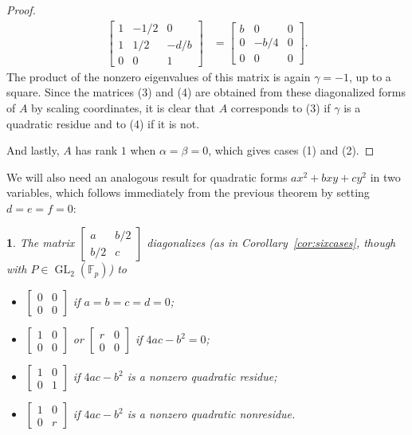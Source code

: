 \documentclass[10pt,a4paper]{amsart}
\numberwithin{equation}{section}
\numberwithin{figure}{section}
\theoremstyle{definition}
\theoremstyle{remark}
\theoremstyle{plain}
\theoremstyle{plain}
\newtheorem{cor}{\protect\corollaryname}[section]
\theoremstyle{definition}
\theoremstyle{plain}
\theoremstyle{plain}
\providecommand{\corollaryname}{Corollary}
\newcommand{\F}{\mathbb{F}}
\newcommand{\GL}{\operatorname{GL}}
\begin{document}
\begin{proof}
\begin{align*}
\begin{bmatrix}
			1 & -1/2 & 0\\
			1 & 1/2 & -d/b\\
			0 & 0 & 1
		\end{bmatrix}
		&=
		\begin{bmatrix}
			b&0&0\\
			0&-b/4&0\\
			0&0&0
		\end{bmatrix}.
	\end{align*}
	The product of the nonzero eigenvalues of this matrix is again $\gamma=-1$, up to a square. Since the matrices (3) and (4) are obtained from these diagonalized forms of $A$ by scaling coordinates, it is clear that $A$ corresponds to (3) if $\gamma$ is a quadratic residue and to (4) if it is not.
	
	And lastly, $A$ has rank $1$ when $\alpha=\beta=0$, which gives cases (1) and (2).
	\end{proof}
	
	We will also need an analogous result for quadratic forms $ax^2+bxy+cy^2$ in two variables, which follows immediately from the previous theorem by setting $d=e=f=0$:
	\begin{cor}\label{cor:diag-P1}
	The matrix $\left[\begin{smallmatrix}a&b/2\\b/2&c\end{smallmatrix}\right]$ diagonalizes (as in Corollary~\ref{cor:sixcases}, though with $P \in \GL_2(\F_p)$) to
	\begin{itemize}
	\item $\left[\begin{smallmatrix}0&0\\0&0\end{smallmatrix}\right]$ if $a=b=c=d=0$;
	\item $\left[\begin{smallmatrix}1&0\\0&0\end{smallmatrix}\right]$ or $\left[\begin{smallmatrix}r&0\\0&0\end{smallmatrix}\right]$ if $4ac-b^2=0$;
	\item $\left[\begin{smallmatrix}1&0\\0&1\end{smallmatrix}\right]$ if $4ac-b^2$ is a nonzero quadratic residue;
	\item $\left[\begin{smallmatrix}1&0\\0&r\end{smallmatrix}\right]$ if $4ac-b^2$ is a nonzero quadratic nonresidue.
	\end{itemize}
	\end{cor}
\end{document}
